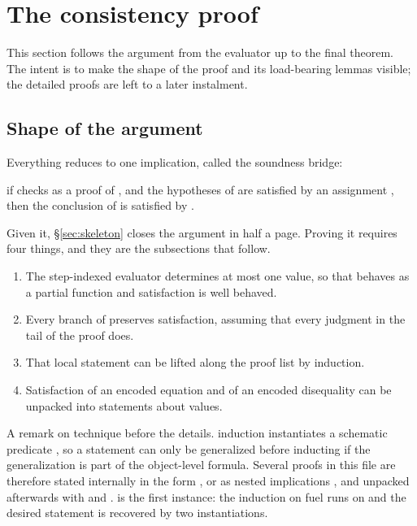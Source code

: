 \section{The consistency proof}
\label{sec:proof}

This section follows the argument from the evaluator up to the final theorem.
The intent is to make the shape of the proof and its load-bearing lemmas
visible; the detailed proofs are left to a later instalment.

\subsection{Shape of the argument}

Everything reduces to one implication, called the soundness bridge:

\begin{center}
if  checks as a proof of , and the hypotheses of  are
satisfied by an assignment , then the conclusion of  is satisfied
by .
\end{center}

\noindent
Given it, \S\ref{sec:skeleton} closes the argument in half a page.  Proving it
requires four things, and they are the subsections that follow.

\begin{enumerate}
\item The step-indexed evaluator determines at most one value, so that
       behaves as a partial function and satisfaction is well
      behaved.
\item Every branch of  preserves satisfaction, assuming that
      every judgment in the tail of the proof does.
\item That local statement can be lifted along the proof list by induction.
\item Satisfaction of an encoded equation and of an encoded disequality can be
      unpacked into statements about values.
\end{enumerate}

\noindent
A remark on technique before the details.  \QGA{} induction instantiates a
schematic predicate , so a statement can only be generalized before
inducting if the generalization is part of the object-level formula.  Several
proofs in this file are therefore stated internally in the form
, or as nested implications , and unpacked
afterwards with  and .   is the first
instance: the induction on fuel runs on  and
the desired statement is recovered by two instantiations.


